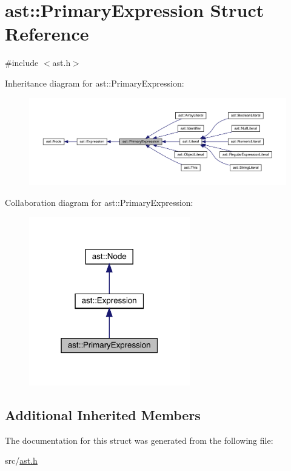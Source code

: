 \hypertarget{structast_1_1_primary_expression}{}\section{ast\+:\+:Primary\+Expression Struct Reference}
\label{structast_1_1_primary_expression}


{\ttfamily \#include $<$ast.\+h$>$}



Inheritance diagram for ast\+:\+:Primary\+Expression\+:
\nopagebreak
\begin{figure}[H]
\begin{center}
\leavevmode
\includegraphics[width=350pt]{structast_1_1_primary_expression__inherit__graph}
\end{center}
\end{figure}


Collaboration diagram for ast\+:\+:Primary\+Expression\+:
\nopagebreak
\begin{figure}[H]
\begin{center}
\leavevmode
\includegraphics[width=199pt]{structast_1_1_primary_expression__coll__graph}
\end{center}
\end{figure}
\subsection*{Additional Inherited Members}


The documentation for this struct was generated from the following file\+:\begin{DoxyCompactItemize}
\item 
src/\hyperlink{ast_8h}{ast.\+h}\end{DoxyCompactItemize}
